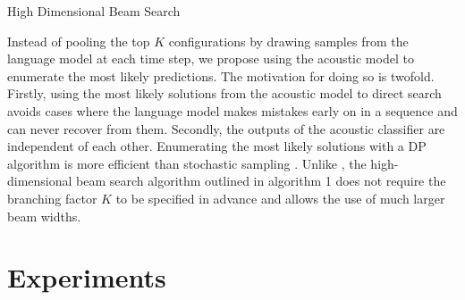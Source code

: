 \documentclass{article}
\DeclareMathOperator*{\argmax}{\arg\!\max}
\begin{document}


\begin{algorithm}
\caption{High Dimensional Beam Search \cite{boulanger2013high}}
\begin{algorithmic}
		\EndFor
	\EndWhile
\EndFor
{}
\end{algorithmic}
\end{algorithm}


Instead of pooling the top $K$ configurations by drawing samples from the language model at each time step, we propose using the acoustic model to enumerate the most likely predictions. The motivation for doing so is twofold. Firstly, using the most likely solutions from the acoustic model to direct search avoids cases where the language model makes mistakes early on in a sequence and can never recover from them. Secondly, the outputs of the acoustic classifier are independent of each other. Enumerating the most likely solutions with a DP algorithm is more efficient than stochastic sampling \cite{boulanger2013high}. Unlike \cite{boulanger2013high}, the high-dimensional beam search algorithm outlined in algorithm 1 does not require the branching factor $K$ to be specified in advance and allows the use of much larger beam widths.
%
%

\section{Experiments}
\end{document}
